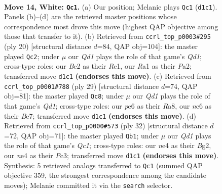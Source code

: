 \documentclass[11pt]{article}
\begin{document}
\clearpage

\begin{figure}[p]\centering
\begin{subfigure}{0.46\textwidth}\centering
\resizebox{\linewidth}{!}{%
\newchessgame
\chessboard[
  setfen={r3r1k1/1p1bqppp/p1n1p3/2Pp4/3Pn3/P1N2N1P/1P2BPP1/R2Q1RK1 w - - 0 14},
  showmover=false,
  pgfstyle=straightmove, color=movearrow, markmove={d1-c1}
]}
\caption{}
\end{subfigure}\hfill
\begin{subfigure}{0.46\textwidth}\centering
\resizebox{\linewidth}{!}{%
\newchessgame
\chessboard[
  setfen={r2q1rk1/pbp1nppp/1p2p3/3p4/2PPn3/2N1PN2/PP2BPPP/2RQ1RK1 w - - 2 11},
  showmover=false,
  pgfstyle=straightmove, color=movearrow, markmove={d1-c2}
]}
\caption{}
\end{subfigure}
\\[4pt]
\begin{subfigure}{0.46\textwidth}\centering
\resizebox{\linewidth}{!}{%
\newchessgame
\chessboard[
  setfen={r2q1rk1/1p2bppp/p1n1pn2/2Pp4/1P1N4/2P1B2P/P2NQPP1/3R1RK1 b - - 2 15},
  showmover=false,
  pgfstyle=straightmove, color=movearrow, markmove={d8-c8}
]}
\caption{}
\end{subfigure}\hfill
\begin{subfigure}{0.46\textwidth}\centering
\resizebox{\linewidth}{!}{%
\newchessgame
\chessboard[
  setfen={2r2rk1/pp1b2pp/2n1pq2/5p2/2pPnN2/2P1B1P1/PP2PPB1/R1Q2RK1 w - - 3 17},
  showmover=false,
  pgfstyle=straightmove, color=movearrow, markmove={c1-b1}
]}
\caption{}
\end{subfigure}
\caption{\textbf{Move 14, White: \texttt{Qc1}.} (a) Our position; Melanie plays \texttt{Qc1} (\texttt{d1c1}). Panels (b)--(d) are the retrieved master positions whose correspondence most drove this move (highest QAP objective among those that transfer to it). (b) Retrieved from \texttt{ccrl\_top\_p0003\#295} (ply 20) [structural distance $d$=84, QAP obj=104]: the master played \texttt{Qc2}; under $\mu$ our \emph{Qd1} plays the role of that game's \emph{Qd1}; cross-type roles: our \emph{B}e2 as their \emph{R}c1, our \emph{R}a1 as their \emph{P}a2; transferred move \texttt{d1c1} \textbf{(endorses this move)}. (c) Retrieved from \texttt{ccrl\_top\_p0001\#788} (ply 29) [structural distance $d$=74, QAP obj=81]: the master played \texttt{Qc8}; under $\mu$ our \emph{Qd1} plays the role of that game's \emph{Qd1}; cross-type roles: our \emph{p}e6 as their \emph{R}a8, our \emph{n}c6 as their \emph{B}e7; transferred move \texttt{d1c1} \textbf{(endorses this move)}. (d) Retrieved from \texttt{ccrl\_top\_p0000\#573} (ply 32) [structural distance $d$=72, QAP obj=71]: the master played \texttt{Qb1}; under $\mu$ our \emph{Qd1} plays the role of that game's \emph{Qc1}; cross-type roles: our \emph{n}e4 as their \emph{B}g2, our \emph{n}e4 as their \emph{P}c3; transferred move \texttt{d1c1} \textbf{(endorses this move)}. Synthesis: 5 retrieved analogs transferred to \texttt{Qc1} (summed QAP objective 359, the strongest correspondence among the candidate moves); Melanie committed it via the \texttt{search} selector.}
\label{fig:thought-m26}
\end{figure}
\end{document}
